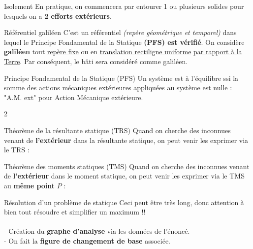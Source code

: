 \documentclass{article} %
\begin{document}
{\begin{definition}{Isolement}
En pratique, on commencera par entourer 1 ou plusieurs solides pour lesquels on a \textbf{2 efforts extérieurs}.
\end{definition}
\begin{definition}{Référentiel galiléen}
C'est un référentiel \textit{(repère géométrique et temporel)} dans lequel le Principe Fondamental de la Statique \textbf{(PFS) est vérifié}.
On considère \textbf{galiléen} tout \underline{repère fixe} ou en \underline{translation rectiligne uniforme} \underline{par rapport à la Terre}.
Par conséquent, le bâti sera considéré comme galiléen.
\end{definition}
\begin{definition}{Principe Fondamental de la Statique (PFS)}
Un système est à l'équilibre ssi la somme des actions mécaniques extérieures appliquées au système est nulle :
\vspace*{-20pt}
{\small "A.M. ext" pour Action Mécanique extérieure. }
\end{definition}
\begin{multicols}{2}
\begin{propriété}{Théorème de la résultante statique (TRS)}
Quand on cherche des inconnues venant de \textbf{l'extérieur} dans la résultante statique, on peut venir les exprimer via le TRS :
\end{propriété}
\begin{propriété}{Théorème des moments statiques (TMS)}
Quand on cherche des inconnues venant de \textbf{l'extérieur} dans le moment statique, on peut venir les exprimer via le TMS au \textbf{même point} $P$ :
\end{propriété}
\end{multicols}
\begin{méthode}[label=méthodoPFS]{Résolution d'un problème de statique}
Ceci peut être très long, donc attention à bien tout résoudre et simplifier un maximum !!\\\\
- Création du \textbf{graphe d'analyse} via les données de l'énoncé.\\
- On fait la \textbf{figure de changement de base} associée.\\

\end{méthode}}
\end{document}
